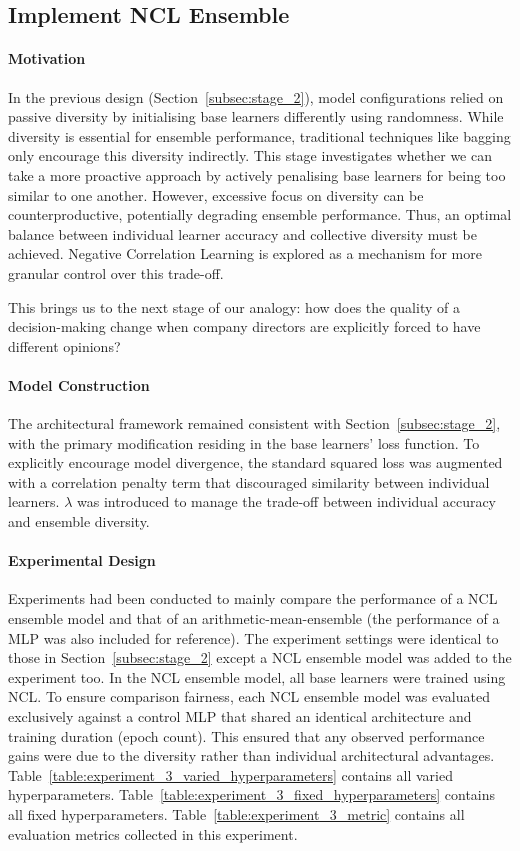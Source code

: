 \subsection{Implement NCL Ensemble}
\label{subsec:stage_3}
\paragraph{Motivation}
In the previous design (Section~\ref{subsec:stage_2}), model configurations relied on passive diversity by initialising base learners differently using randomness. While diversity is essential for ensemble performance, traditional techniques like bagging only encourage this diversity indirectly. This stage investigates whether we can take a more proactive approach by actively penalising base learners for being too similar to one another. However, excessive focus on diversity can be counterproductive, potentially degrading ensemble performance. Thus, an optimal balance between individual learner accuracy and collective diversity must be achieved. Negative Correlation Learning is explored as a mechanism for more granular control over this trade-off. 

This brings us to the next stage of our analogy: how does the quality of a decision-making change when company directors are explicitly forced to have different opinions? 


\paragraph{Model Construction}
The architectural framework remained consistent with Section~\ref{subsec:stage_2}, with the primary modification residing in the base learners' loss function. To explicitly encourage model divergence, the standard squared loss was augmented with a correlation penalty term that discouraged similarity between individual learners. $\lambda$ was introduced to manage the trade-off between individual accuracy and ensemble diversity. 


\paragraph{Experimental Design}
Experiments had been conducted to mainly compare the performance of a NCL ensemble model and that of an arithmetic-mean-ensemble (the performance of a MLP was also included for reference). The experiment settings were identical to those in Section~\ref{subsec:stage_2} except a NCL ensemble model was added to the experiment too. In the NCL ensemble model, all base learners were trained using NCL. To ensure comparison fairness, each NCL ensemble model was evaluated exclusively against a control MLP that shared an identical architecture and training duration (epoch count). This ensured that any observed performance gains were due to the diversity rather than individual architectural advantages. Table~\ref{table:experiment_3_varied_hyperparameters} contains all varied hyperparameters. Table~\ref{table:experiment_3_fixed_hyperparameters} contains all fixed hyperparameters. Table~\ref{table:experiment_3_metric} contains all evaluation metrics collected in this experiment. 

